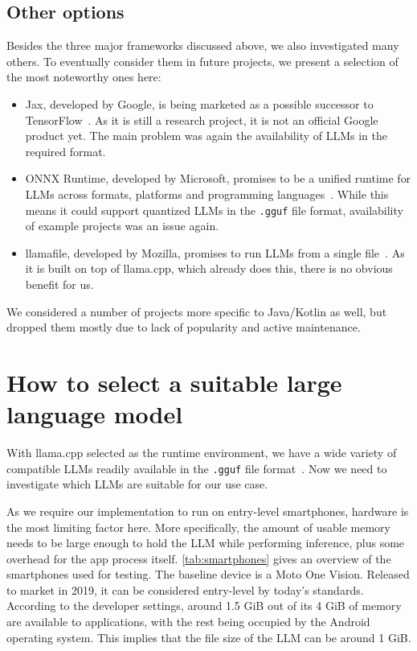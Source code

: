 \subsection{Other options}
\label{sec:otherOptions}
Besides the three major frameworks discussed above, we also investigated many others. To eventually consider them in future projects, we present a selection of the most noteworthy ones here:
\begin{itemize}
	\item Jax, developed by Google, is being marketed as a possible successor to TensorFlow~\cite{jaxJaxmlJax2025}. As it is still a research project, it is not an official Google product yet. The main problem was again the availability of \glspl{LLM} in the required format.
	\item ONNX Runtime, developed by Microsoft, promises to be a unified runtime for \glspl{LLM} across formats, platforms and programming languages~\cite{onnxruntimedevelopersONNXRuntime2018,onnxruntimeONNXRuntimeHome}. While this means it could support quantized \glspl{LLM} in the \lstinline|.gguf| file format, availability of example projects was an issue again.
	\item llamafile, developed by Mozilla, promises to run \glspl{LLM} from a single file~\cite{mozillaMozillaOchoLlamafile2025,hoodIntroducingLlamafileMozilla2023}. As it is built on top of llama.cpp, which already does this, there is no obvious benefit for us.
\end{itemize}

We considered a number of projects more specific to Java/Kotlin as well, but dropped them mostly due to lack of popularity and active maintenance.

\section{How to select a suitable large language model}
\label{sec:howToSelectASuitableLLM}
With llama.cpp selected as the runtime environment, we have a wide variety of compatible \glspl{LLM} readily available in the \lstinline|.gguf| file format~\cite{huggingfaceModelsHuggingFace2025}. Now we need to investigate which \glspl{LLM} are suitable for our use case.

As we require our implementation to run on entry-level smartphones, hardware is the most limiting factor here. More specifically, the amount of usable memory needs to be large enough to hold the \gls{LLM} while performing inference, plus some overhead for the app process itself. \cref{tab:smartphones} gives an overview of the smartphones used for testing. The baseline device is a Moto One Vision. Released to market in 2019, it can be considered entry-level by today's standards. According to the developer settings, around 1.5 GiB out of its 4 GiB of memory are available to applications, with the rest being occupied by the Android operating system. This implies that the file size of the \gls{LLM} can be around 1 GiB.

